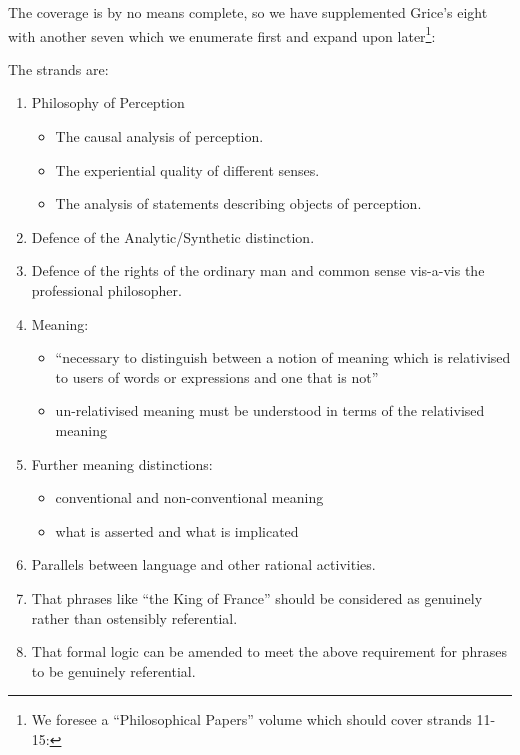 \documentclass[10pt,titlepage]{book}
\begin{document}
The coverage is by no means complete, so we have supplemented Grice's eight with another seven which we enumerate first and expand upon later\footnote{
We foresee a ``Philosophical Papers'' volume which should cover strands 11-15:
}:

The strands are:

\begin{enumerate}
\item Philosophy of Perception
\begin{itemize}
\item The causal analysis of perception.
\item The experiential quality of different senses.
\item The analysis of statements describing objects of perception.
\end{itemize}

\item Defence of the Analytic/Synthetic distinction.

\item Defence of the rights of the ordinary man and common sense vis-a-vis the professional philosopher.

\item Meaning:
\begin{itemize}
\item ``necessary to distinguish between a notion of meaning which is relativised to users of words or expressions and one that is not''
\item un-relativised meaning must be understood in terms of the relativised meaning
\end{itemize}

\item Further meaning distinctions:
\begin{itemize}
\item conventional and non-conventional meaning
\item what is asserted and what is implicated
\end{itemize}

\item Parallels between language and other rational activities.

\item That phrases like ``the King of France'' should be considered as genuinely rather than ostensibly referential.

\item That formal logic can be amended to meet the above requirement for phrases to be genuinely referential.


\end{enumerate}
\end{document}
